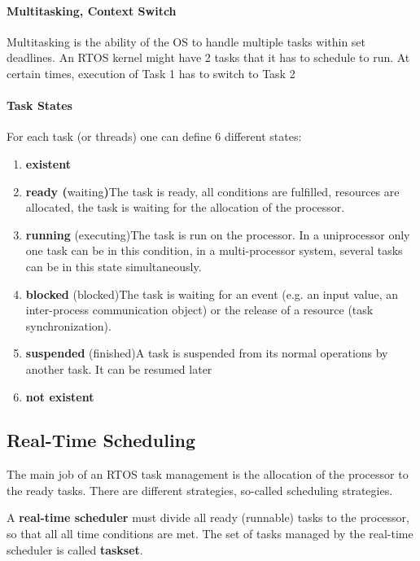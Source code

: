 \paragraph{ Multitasking, Context Switch }

Multitasking is the ability of the OS to handle multiple tasks within set deadlines. An RTOS kernel might have 2 tasks that it has to schedule to run. At certain times, execution of Task 1 has to switch to Task 2

\paragraph{  Task States}

For each task (or threads) one can define 6 different states:

\begin{enumerate}
	\item  \textbf{existent}
	\item \textbf{ ready (}waiting\textbf{)}The task is ready, all conditions are fulfilled, resources are allocated, the task is waiting for the allocation of the processor.
	\item  \textbf{running }(executing)The task is run on the processor. In a uniprocessor only one task can be in this condition, in a multi-processor system, several tasks can be in this state simultaneously. 
	\item  \textbf{blocked} (blocked)The task is waiting for an event (e.g. an input value, an inter-process communication object) or the release of a resource (task synchronization). 
	\item  \textbf{suspended }(finished)A task is suspended from its normal operations by another task. It can be resumed later
	\item  \textbf{not existent}
\end{enumerate}

\subsection{  Real-Time Scheduling}

The main job of an RTOS task management is the allocation of the processor to the ready tasks. There are different strategies, so-called scheduling strategies.

A \textbf{real-time scheduler} must divide all ready (runnable) tasks to the processor, so that all all time conditions are met. The set of tasks managed by the real-time scheduler is called \textbf{taskset}.


